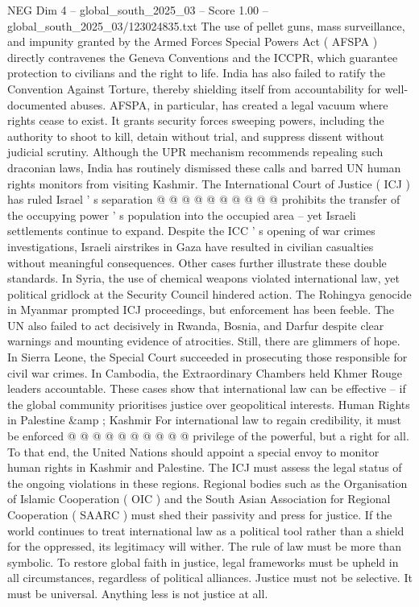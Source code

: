 \begin{textsample}{NEG Dim 4 – global\_south\_2025\_03 – Score 1.00 – global\_south\_2025\_03/123024835.txt}
The use of pellet guns, mass surveillance, and impunity granted by the Armed Forces Special Powers Act ( AFSPA ) directly contravenes the Geneva Conventions and the ICCPR, which guarantee protection to civilians and the right to life.
India has also failed to ratify the Convention Against Torture, thereby shielding itself from accountability for well-documented abuses.
AFSPA, in particular, has created a legal vacuum where rights cease to exist.
It grants security forces sweeping powers, including the authority to shoot to kill, detain without trial, and suppress dissent without judicial scrutiny.
Although the UPR mechanism recommends repealing such draconian laws, India has routinely dismissed these calls and barred UN human rights monitors from visiting Kashmir.
The International Court of Justice ( ICJ ) has ruled Israel ' s separation @ @ @ @ @ @ @ @ @ @ prohibits the transfer of the occupying power ' s population into the occupied area -- yet Israeli settlements continue to expand.
Despite the ICC ' s opening of war crimes investigations, Israeli airstrikes in Gaza have resulted in civilian casualties without meaningful consequences.
Other cases further illustrate these double standards.
In Syria, the use of chemical weapons violated international law, yet political gridlock at the Security Council hindered action.
The Rohingya genocide in Myanmar prompted ICJ proceedings, but enforcement has been feeble.
The UN also failed to act decisively in Rwanda, Bosnia, and Darfur despite clear warnings and mounting evidence of atrocities.
Still, there are glimmers of hope.
In Sierra Leone, the Special Court succeeded in prosecuting those responsible for civil war crimes.
In Cambodia, the Extraordinary Chambers held Khmer Rouge leaders accountable.
These cases show that international law can be effective -- if the global community prioritises justice over geopolitical interests.
Human Rights in Palestine \&amp ; Kashmir For international law to regain credibility, it must be enforced @ @ @ @ @ @ @ @ @ @ privilege of the powerful, but a right for all.
To that end, the United Nations should appoint a special envoy to monitor human rights in Kashmir and Palestine.
The ICJ must assess the legal status of the ongoing violations in these regions.
Regional bodies such as the Organisation of Islamic Cooperation ( OIC ) and the South Asian Association for Regional Cooperation ( SAARC ) must shed their passivity and press for justice.
If the world continues to treat international law as a political tool rather than a shield for the oppressed, its legitimacy will wither.
The rule of law must be more than symbolic.
To restore global faith in justice, legal frameworks must be upheld in all circumstances, regardless of political alliances.
Justice must not be selective.
It must be universal.
Anything less is not justice at all.

\end{textsample}
